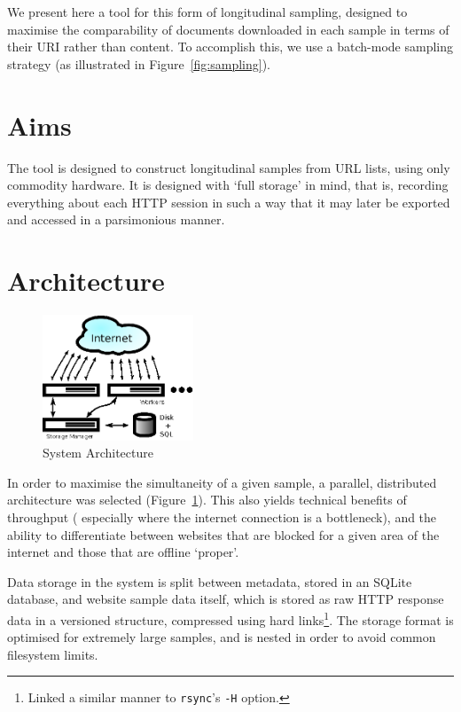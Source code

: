 \documentclass[11pt]{article}
\begin{document}
We present here a tool for this form of longitudinal sampling, designed to maximise the comparability of documents downloaded in each sample in terms of their URI rather than content.  To accomplish this, we use a batch-mode sampling strategy (as illustrated in Figure~\ref{fig:sampling}).


\section{Aims}
The tool is designed to construct longitudinal samples from URL lists, using only commodity hardware.  It is designed with `full storage' in mind, that is, recording everything about each HTTP session in such a way that it may later be exported and accessed in a parsimonious manner.

\section{Architecture}

\begin{figure}[h]
\centering
\includegraphics[width=0.4\textwidth]{images/arch.eps}
\caption{System Architecture}
\label{fig:arch}
\end{figure}
In order to maximise the simultaneity of a given sample, a parallel, distributed architecture was selected (Figure~\ref{fig:arch}).  This also yields technical benefits of throughput ( especially where the internet connection is a bottleneck), and the ability to differentiate between websites that are blocked for a given area of the internet and those that are offline `proper'.

Data storage in the system is split between metadata, stored in an SQLite database, and website sample data itself, which is stored as raw HTTP response data in a versioned structure, compressed using hard links\footnote{Linked a similar manner to \texttt{rsync}'s \texttt{-H} option.}.  The storage format is optimised for extremely large samples, and is nested in order to avoid common filesystem limits.
\end{document}
